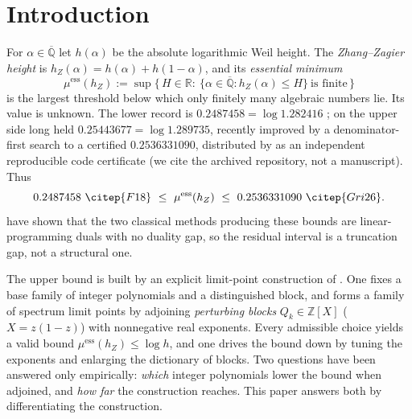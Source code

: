 \documentclass[11pt,reqno]{amsart}
\theoremstyle{plain}
\theoremstyle{definition}
\newcommand{\Q}{\mathbb{Q}}
\newcommand{\Z}{\mathbb{Z}}
\newcommand{\R}{\mathbb{R}}
\newcommand{\Qbar}{\overline{\Q}}
\newcommand{\hZ}{h_Z}
\newcommand{\essmin}{\mu^{\mathrm{ess}}(\hZ)}
\begin{document}
\maketitle

\section{Introduction}\label{sec:intro}

For $\alpha\in\Qbar$ let $h(\alpha)$ be the absolute logarithmic Weil height. The
\emph{Zhang--Zagier height} \citep{Zha95,Zag93} is $\hZ(\alpha)=h(\alpha)+h(1-\alpha)$,
and its \emph{essential minimum}
\begin{equation}\label{eq:def}
  \essmin:=\sup\bigl\{\,H\in\R:\ \{\alpha\in\Qbar:\hZ(\alpha)\le H\}\ \text{is finite}\,\bigr\}
\end{equation}
is the largest threshold below which only finitely many algebraic numbers lie. Its
value is unknown. The lower record is $0.2487458=\log1.282416$ \citep{F18}; on the
upper side \citet{Doc01b} long held $0.25443677=\log1.289735$, recently improved by a
denominator-first search to a certified $0.2536331090$, distributed by \citet{Gri26} as
an independent reproducible code certificate (we cite the archived repository, not a
manuscript). Thus
\[
  0.2487458\ \citep{F18}\ \le\ \essmin\ \le\ 0.2536331090\ \citep{Gri26}.
\]
\citet{BMQS} have shown that the two classical methods producing these bounds are
linear-programming duals with no duality gap, so the residual interval is a
truncation gap, not a structural one.

The upper bound is built by an explicit limit-point construction of
\citet{Doc01a,Doc01b}. One fixes a base family of integer polynomials and a
distinguished block, and forms a family of spectrum limit points by adjoining
\emph{perturbing blocks} $Q_k\in\Z[X]$ ($X=z(1-z)$) with nonnegative real exponents.
Every admissible choice yields a valid bound $\essmin\le\log h$, and one drives the
bound down by tuning the exponents and enlarging the dictionary of blocks. Two
questions have been answered only empirically: \emph{which} integer polynomials lower
the bound when adjoined, and \emph{how far} the construction reaches. This paper
answers both by differentiating the construction.
\end{document}
